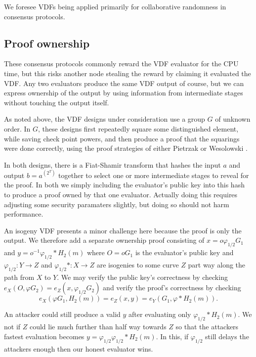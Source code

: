 \documentclass{article}
\newcommand\mathperiod{.}
\begin{document}
We foresee VDFs being applied primarily for collaborative randomness
in consensus protocols.  

\subsection{Proof ownership}

These consensus protocols commonly reward the VDF evaluator for the
CPU time, but this risks another node stealing the reward by claiming
it evaluated the VDF.  Any two evaluators produce the same VDF output
of course, but we can express ownership of the output by using
information from intermediate stages without touching the output itself.

As noted above, the VDF designs under consideration use a group $G$
of unknown order.  In $G$, these designs first repeatedly square
some distinguished element, while saving check point powers, and
then produce a proof that the squarings were done correctly, using
the proof strategies of
 either Pietrzak \cite{Pietrzak} or Wesolowski \cite{Wesolowski}.

In both designs, there is a Fiat-Shamir transform that hashes the
input $a$ and output $b = a^(2^T)$ together to select one or more
intermediate stages to reveal for the proof.  In both we simply
including the evaluator's public key into this hash to produce a
proof owned by that one evaluator.  Actually doing this requires
adjusting some security paramaters slightly, but doing so should not
harm performance. 

An isogeny VDF presents a minor challenge here because the proof
is only the output.  We therefore add a separate ownership proof
consisting of $x = o φ_{1/2} G_1$ and $y = o^{-1} φ_{1/2}* H_2(m)$
where $O = o G_1$ is the evaluator's public key and
$φ_{1/2} : Y \to Z$ and $φ_{1/2}* : X \to Z$ are isogenies to
some curve $Z$ part way along the path from $X$ to $Y$.
We may verify the public key's correctness by checking
$e_X(O, φ G_2) = e_Z(x, φ_{1/2} G_2)$ and verify the proof's correctness by
checking
$$ e_X( φ G_1, H_2(m) ) = e_Z( x, y ) = e_Y( G_1, φ* H_2(m) ) \mathperiod $$

An attacker could still produce a valid $y$ after evaluating only
$φ_{1/2}* H_2(m)$.  We not  if $Z$ could lie much further than
half way towards $Z$ so that the attackers fastest evaluation
becomes $y = φ_{1/2} φ_{1/2}* H_2(m)$.  In this, if $φ_{1/2}$ 
still delays the attackers enough then our honest evaluator wins.

\smallskip
\end{document}
